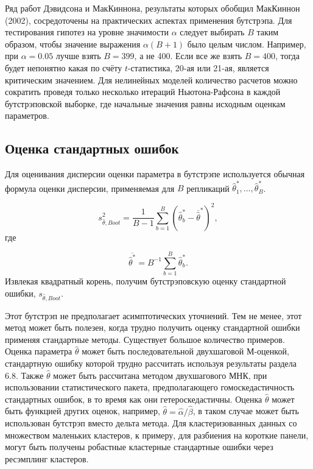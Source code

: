 Ряд работ Дэвидсона и МакКиннона, результаты которых обобщил МакКиннон (2002), сосредоточены на практических аспектах применения бутстрэпа. Для тестирования гипотез на уровне значимости $\alpha$ следует выбирать $B$ таким образом, чтобы значение выражения $\alpha(B+1)$ было целым числом. Например, при $\alpha=0.05$ лучше взять $B=399$, а не 400. Если все же взять $B=400$, тогда будет непонятно какая по счёту $t$-статистика, 20-ая или 21-ая, является критическим значением. Для нелинейных моделей количество расчетов можно сократить проведя только несколько итераций Ньютона-Рафсона в каждой бутстрэповской выборке, где начальные значения равны исходным оценкам параметров.

\subsection{Оценка стандартных ошибок}

Для оценивания дисперсии оценки параметра в бутстрэпе используется обычная формула оценки дисперсии, применяемая для $B$ репликаций $\hat{\theta}_1^*,\ldots ,\hat{\theta}_B^*$.

\begin{equation}
s_{\hat{\theta},Boot}^2=\dfrac{1}{B-1}\sum_{b=1}^B(\hat{\theta}_b^*-\overline{\hat{\theta}}^*)^2,
\end{equation} 
где

\begin{equation}
\overline{\hat{\theta}^*}=B^{-1}\sum_{b=1}^B\hat{\theta}_b^*.
\end{equation}
Извлекая квадратный корень, получим бутстрэповскую оценку стандартной ошибки, $s_{\hat{\theta},Boot}$.

Этот бутстрэп не предполагает асимптотических уточнений. Тем не менее, этот метод может быть полезен, когда трудно получить оценку стандартной ошибки применяя стандартные методы. Существует большое количество примеров. Оценка параметра $\hat{\theta}$ может быть последовательной двухшаговой М-оценкой, стандартную ошибку которой трудно рассчитать используя результаты раздела 6.8. Также $\hat{\theta}$ может быть рассчитана методом двухшагового МНК, при использовании статистического пакета, предполагающего гомоскедастичность стандартных ошибок, в то время как они гетероскедастичны. Оценка $\hat{\theta}$ может быть функцией других оценок, например, $\hat{\theta}=\hat{\alpha}/\hat{\beta}$, в таком случае может быть использован бутстрэп вместо дельта метода. Для кластеризованных данных со  множеством маленьких кластеров, к примеру, для разбиения на короткие панели, могут быть получены робастные кластерные стандартные ошибки через ресэмплинг кластеров.


